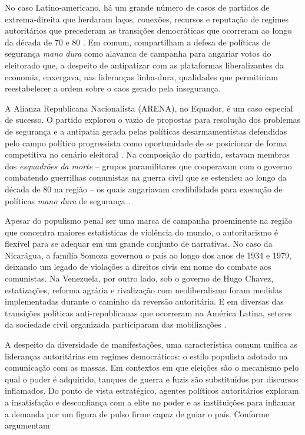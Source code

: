 \documentclass[
12pt,				%
openright,			%
twoside,			%
a4paper,			%
english,			%
french,				%
spanish,			%
brazil				%
]{abntex2}
\begin{document}
No caso Latino-americano, há um grande número de casos de partidos de extrema-direita que herdaram laços, conexões, recursos e reputação de regimes autoritários que precederam as transições democráticas que ocorreram ao longo da década de 70 e 80 \cite{loxton2014authoritarian}. Em comum, compartilham a defesa de políticas de segurança \emph{mano dura} como alavanca de campanha para angariar votos do eleitorado que, a despeito de antipatizar com as plataformas liberalizantes da economia, enxergava, nas lideranças linha-dura, qualidades que permitiriam reestabelecer a ordem sobre o caos gerado pela insegurança.

A Alianza Republicana Nacionalista (ARENA), no Equador, é um caso especial de sucesso. O partido explorou o vazio de propostas para resolução dos problemas de segurança e a antipatia gerada pelas políticas desarmamentistas defendidas pelo campo político progressista como oportunidade de se posicionar de forma competitiva no cenário eleitoral \cite{holland2013right}. Na composição do partido, estavam membros dos \emph{esquadrões da morte} -- grupos paramilitares que cooperavam com o governo combatendo guerrilhas comunistas na guerra civil que se estendeu ao longo da década de 80 na região -- os quais angariavam credibilidade para execução de políticas \emph{mano dura} de segurança \cite{loxton2014authoritarian}.

Apesar do populismo penal ser uma marca de campanha proeminente na região que concentra maiores estatísticas de violência do mundo, o autoritarismo é flexível para se adequar em um grande conjunto de narrativas. No caso da Nicarágua, a família Somoza governou o país ao longo dos anos de 1934 e 1979, deixando um legado de violações a direitos civis em nome do combate aos comunistas. Na Venezuela, por outro lado, sob o governo de Hugo Chavez, estatizações, reforma agrária e rivalização com neoliberalismo foram medidas implementadas durante o caminho da reversão autoritária. E em diversas das transições políticas anti-republicanas que ocorreram na América Latina, setores da sociedade civil organizada participaram das mobilizações \cite{valenzuela2004latin}.

A despeito da diversidade de manifestações, uma característica comum unifica as lideranças autoritárias em regimes democráticos: o estilo populista adotado na comunicação com as massas. Em contextos em que eleições são o mecanismo pelo qual o poder é adquirido, tanques de guerra e fuzis são substituídos por discursos inflamados. Do ponto de vista estratégico, agentes políticos autoritários exploram a insatisfação e desconfiança com a elite no poder e as instituições para inflamar a demanda por um figura de pulso firme capaz de guiar o país. Conforme argumentam 
\end{document}
